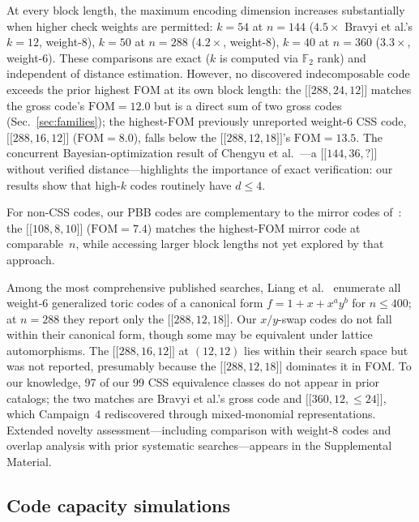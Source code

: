 \documentclass[aps,prxquantum,twocolumn,superscriptaddress,nofootinbib]{revtex4-2}
\newcommand{\FF}{\ensuremath{\mathbb{F}}}
\newcommand{\dblbrk}[1]{\ensuremath{\lbrack\!\lbrack #1 \rbrack\!\rbrack}}
\newcommand{\code}[1]{\dblbrk{#1}}
\newcommand{\FOM}{\ensuremath{\mathrm{FOM}}}
\begin{document}
At every block length, the maximum encoding dimension increases substantially when higher check weights are permitted: $k = 54$ at $n = 144$ ($4.5\times$ Bravyi et al.'s $k = 12$, weight-8), $k = 50$ at $n = 288$ ($4.2\times$, weight-8), $k = 40$ at $n = 360$ ($3.3\times$, weight-6).
These comparisons are exact ($k$ is computed via $\FF_2$ rank) and independent of distance estimation.
However, no discovered indecomposable code exceeds the prior highest $\FOM$ at its own block length: the $\code{288,24,12}$ matches the gross code's $\FOM = 12.0$ but is a direct sum of two gross codes (Sec.~\ref{sec:families}); the highest-$\FOM$ previously unreported weight-6 CSS code, $\code{288,16,12}$ ($\FOM = 8.0$), falls below the $\code{288,12,18}$'s $\FOM = 13.5$.
The concurrent Bayesian-optimization result of Chengyu et al.~\cite{chengyu2026bayesian}---a $\code{144,36,?}$ without verified distance---highlights the importance of exact verification: our results show that high-$k$ codes routinely have $d \leq 4$.

For non-CSS codes, our PBB codes are complementary to the mirror codes of~\cite{khesin2026mirror}: the $\code{108,8,10}$ ($\FOM = 7.4$) matches the highest-$\FOM$ mirror code at comparable~$n$, while accessing larger block lengths not yet explored by that approach.

Among the most comprehensive published searches, Liang et al.~\cite{liang2025generalized} enumerate all weight-6 generalized toric codes of a canonical form $f = 1{+}x{+}x^a y^b$ for $n \leq 400$; at $n = 288$ they report only the $\code{288,12,18}$.
Our $x/y$-swap codes do not fall within their canonical form, though some may be equivalent under lattice automorphisms.
The $\code{288,16,12}$ at $(12,12)$ lies within their search space but was not reported, presumably because the $\code{288,12,18}$ dominates it in $\FOM$.
To our knowledge, 97 of our 99 CSS equivalence classes do not appear in prior catalogs; the two matches are Bravyi et al.'s gross code and $\code{360,12,{\leq}24}$, which Campaign~4 rediscovered through mixed-monomial representations. Extended novelty assessment---including comparison with weight-8 codes and overlap analysis with prior systematic searches---appears in the Supplemental Material.

\subsection{Code capacity simulations}
\label{sec:code_capacity}
\end{document}
